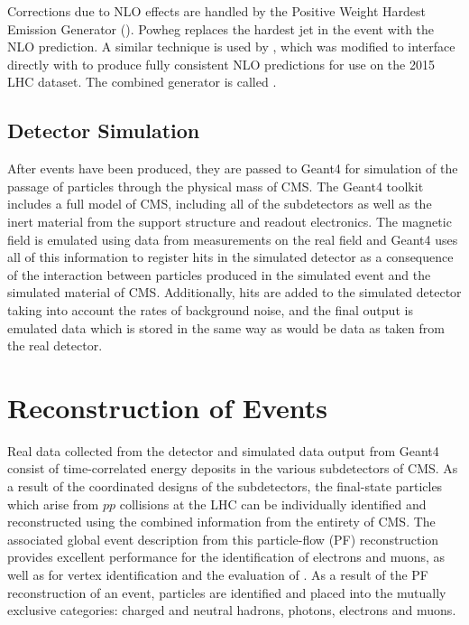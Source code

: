  Corrections due to NLO effects are
  handled by the Positive Weight 
  Hardest Emission Generator (\POWHEG). 
 Powheg replaces the hardest jet in the event 
  with the NLO prediction.
 A similar technique is used by \AMCNLO,
  which was modified to interface directly
  with \MADGRAPH to produce fully consistent 
  NLO predictions for use on the 2015 LHC dataset.
 The combined generator is called \MGAMC.

\subsection{Detector Simulation}

 After events have been produced,
  they are passed to Geant4 
  for simulation of the passage of particles
  through the physical mass of CMS.
 The Geant4 toolkit includes a full
  model of CMS, including 
  all of the subdetectors as well as the
  inert material from the support structure
  and readout electronics.
 The magnetic field is emulated using
  data from measurements on the real field
  and Geant4 uses all of this information
  to register hits in the simulated
  detector as a consequence of the interaction
  between particles produced in the simulated
  event and the simulated material of CMS.
 Additionally, hits are added to the
  simulated detector taking into account
  the rates of background noise, and the
  final output is emulated data
  which is stored in the same way
  as would be data as taken from the real detector.



\section{Reconstruction of Events}\label{sec:reconstruction}

 Real data collected from the detector
  and simulated data output from Geant4
  consist of time-correlated energy deposits
  in the various subdetectors of CMS.
 As a result of the coordinated designs 
  of the subdetectors, the final-state 
  particles which arise from $pp$ collisions 
  at the LHC can be individually identified
  and reconstructed using the combined
  information from the entirety of CMS.
 The associated global event description
  from this particle-flow (PF) reconstruction
  provides excellent performance for
  the identification of electrons and muons,
  as well as for vertex identification
  and the evaluation of \met.
 As a result of the PF reconstruction
  of an event, particles are identified
  and placed into the mutually exclusive
  categories:
  charged and neutral hadrons, photons, 
  electrons and muons.
 
